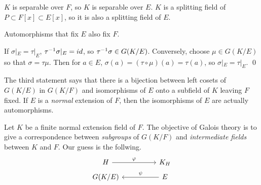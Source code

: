 \pf {} \(K\) is separable over \(F\), so \(K\) is separable over \(E\). \(K\) is a splitting field of \(P \subset F[x] \subset E[x]\), so it is also a splitting field of \(E\).

 Automorphisms that fix \(E\) also fix \(F\).

 If \(\sigma |_E = \tau |_E\), \(\tau^{-1}\sigma|_E = id\), so \(\tau^{-1}\sigma \in G(K/E)\). Conversely, choose \(\mu \in G(K/E)\) so that \(\sigma = \tau\mu\). Then for \(a \in E\), \(\sigma(a) = (\tau\circ\mu)(a) = \tau(a)\), so \(\sigma |_E = \tau |_E\). \qed

The third statement says that there is a bijection between left cosets of \(G(K/E)\) in \(G(K/F)\) and isomorphisms of \(E\) onto a subfield of \(K\) leaving \(F\) fixed. If \(E\) is a \textit{normal} extension of \(F\), then the isomorphisms of \(E\) are actually automorphisms.

Let \(K\) be a finite normal extension field of \(F\). The objective of Galois theory is to give a correspondence between \textit{subgroups} of \(G(K/F)\) and \textit{intermediate fields} between \(K\) and \(F\). Our guess is the follwing.
\[
    \begin{tikzcd}[row sep=tiny]
        H \arrow{rr}{\varphi} && K_H \\
        G(K/E) && E \arrow{ll}[swap]{\psi}
    \end{tikzcd}
\]

\smallskip
